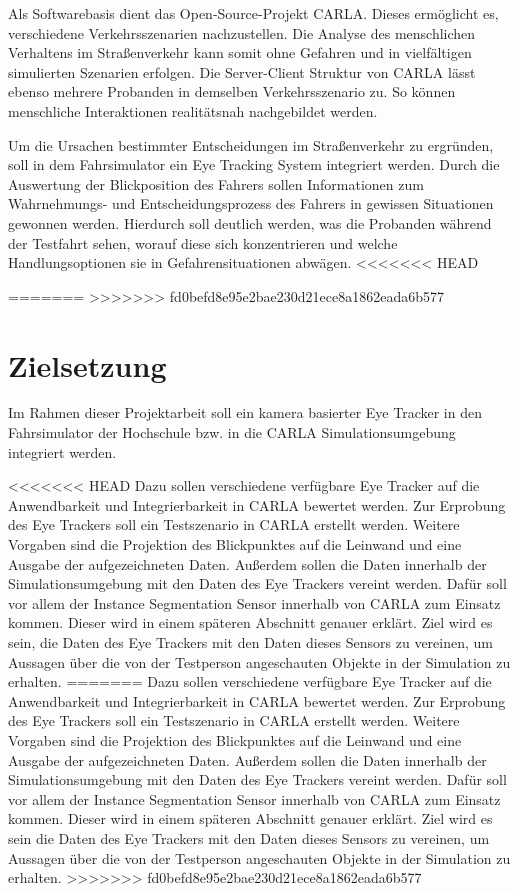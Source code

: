 Als Softwarebasis dient das Open-Source-Projekt \Gls{CARLA}. Dieses ermöglicht es, verschiedene Verkehrsszenarien nachzustellen. Die Analyse des menschlichen Verhaltens im Straßenverkehr kann somit ohne Gefahren und in vielfältigen simulierten Szenarien erfolgen. Die \Gls{Server-Client Struktur} von CARLA lässt ebenso mehrere Probanden in demselben Verkehrsszenario zu. So können menschliche Interaktionen realitätsnah nachgebildet werden.

Um die Ursachen bestimmter Entscheidungen im Straßenverkehr zu ergründen, soll in dem Fahrsimulator ein Eye Tracking System integriert werden. Durch die Auswertung der Blickposition des Fahrers sollen Informationen zum Wahrnehmungs- und Entscheidungsprozess des Fahrers in gewissen Situationen gewonnen werden. Hierdurch soll deutlich werden, was die Probanden während der Testfahrt sehen, worauf diese sich konzentrieren und welche Handlungsoptionen sie in Gefahrensituationen abwägen.
<<<<<<< HEAD

\newpage
=======
>>>>>>> fd0befd8e95e2bae230d21ece8a1862eada6b577

\section{Zielsetzung}

Im Rahmen dieser Projektarbeit soll ein kamera basierter Eye Tracker in den Fahrsimulator der Hochschule bzw. in die CARLA Simulationsumgebung integriert werden.

<<<<<<< HEAD
Dazu sollen verschiedene verfügbare Eye Tracker auf die Anwendbarkeit und Integrierbarkeit in CARLA bewertet werden. Zur Erprobung des Eye Trackers soll ein Testszenario in CARLA erstellt werden. Weitere Vorgaben sind die Projektion des Blickpunktes auf die Leinwand und eine Ausgabe der aufgezeichneten Daten. Außerdem sollen die Daten innerhalb der Simulationsumgebung mit den Daten des Eye Trackers vereint werden. Dafür soll vor allem der \Gls{Instance Segmentation} Sensor innerhalb von CARLA zum Einsatz kommen. Dieser wird in einem späteren Abschnitt genauer erklärt. Ziel wird es sein, die Daten des Eye Trackers mit den Daten dieses Sensors zu vereinen, um Aussagen über die von der Testperson angeschauten Objekte in der Simulation zu erhalten.  
=======
Dazu sollen verschiedene verfügbare Eye Tracker auf die Anwendbarkeit und Integrierbarkeit in CARLA bewertet werden. Zur Erprobung des Eye Trackers soll ein Testszenario in CARLA erstellt werden. Weitere Vorgaben sind die Projektion des Blickpunktes auf die Leinwand und eine Ausgabe der aufgezeichneten Daten. Außerdem sollen die Daten innerhalb der Simulationsumgebung mit den Daten des Eye Trackers vereint werden. Dafür soll vor allem der \Gls{Instance Segmentation} Sensor innerhalb von CARLA zum Einsatz kommen. Dieser wird in einem späteren Abschnitt genauer erklärt. Ziel wird es sein die Daten des Eye Trackers mit den Daten dieses Sensors zu vereinen, um Aussagen über die von der Testperson angeschauten Objekte in der Simulation zu erhalten.  
>>>>>>> fd0befd8e95e2bae230d21ece8a1862eada6b577


